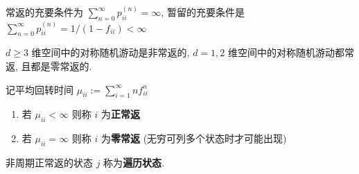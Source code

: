 \documentclass[10pt]{yerbaformat}
\begin{document}
\begin{definition}[判定定理]
    常返的充要条件为 $\sum_{n=0}^{\infty} p_{i i}^{(n)}=\infty$, 暂留的充要条件是 $\sum_{n=0}^{\infty} p_{i i}^{(n)}=1 /\left(1-f_{i i}\right)<\infty$
\end{definition}

\begin{theorem}[Polya 定理]
    $d \geq 3$ 维空间中的对称随机游动是非常返的, $d=1,2$ 维空间中的对称随机游动都常返, 且都是零常返的.
\end{theorem}

\begin{definition}[正常返与零常返]
    记平均回转时间 $\mu_{i i}:=\sum_{i=1}^{\infty} n f_{i i}^{n}$
    \begin{enumerate}
        \item 若 $\mu_{i i}<\infty$ 则称 $i$ 为\textbf{正常返}
        \item 若 $\mu_{i i}=\infty$ 则称 $i$ 为\textbf{零常返} (无穷可列多个状态时才可能出现)
    \end{enumerate}
    非周期正常返的状态 $j$ 称为\textbf{遍历状态}.
\end{definition}


\end{document}
